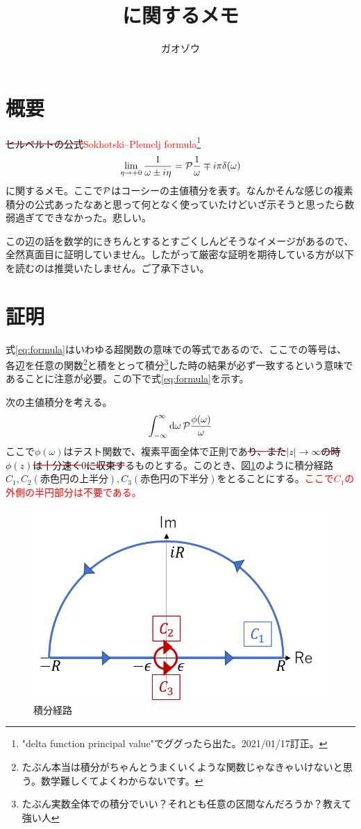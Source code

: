 \documentclass[uplatex,dvipdfmx]{jsarticle}
\title{\Erase{ヒルベルトの公式}\Add{Sokhotski–Plemelj formula}に関するメモ}
\author{ガオゾウ}
\newcommand{\Erase}[1]{\textcolor{red}{\sout{\textcolor{black}{#1}}}}
\newcommand{\Add}[1]{\textcolor{red}{#1}}
\begin{document}
\maketitle
\section{概要}
\Erase{ヒルベルトの公式}\Add{Sokhotski–Plemelj formula}\footnote{"delta function principal value"でググったら出た。2021/01/17訂正。}
\begin{equation}
	\lim_{\eta \to +0}\frac{1}{\omega \pm i\eta} = \pv{\frac{1}{\omega}} \mp i\pi \delta(\omega) \label{eq:formula}
\end{equation}
に関するメモ。ここで$\pv$はコーシーの主値積分を表す。なんかそんな感じの複素積分の公式あったなあと思って何となく使っていたけどいざ示そうと思ったら数弱過ぎてできなかった。悲しい。

この辺の話を数学的にきちんとするとすごくしんどそうなイメージがあるので、全然真面目に証明していません。したがって厳密な証明を期待している方が以下を読むのは推奨いたしません。ご了承下さい。

\section{証明}
式\eqref{eq:formula}はいわゆる超関数の意味での等式であるので、ここでの等号は、各辺を任意の関数\footnote{たぶん本当は積分がちゃんとうまくいくような関数じゃなきゃいけないと思う。数学難しくてよくわからないです。}と積をとって積分\footnote{たぶん実数全体での積分でいい？それとも任意の区間なんだろうか？教えて強い人}した時の結果が必ず一致するという意味であることに注意が必要。この下で式\eqref{eq:formula}を示す。

次の主値積分を考える。
\begin{equation}
	\int_{-\infty}^{\infty} \dd{\omega} \pv{ \frac{\phi(\omega)}{\omega}}
\end{equation}
ここで$\phi(\omega)$はテスト関数で、複素平面全体で正則であ\Erase{り、また$|z|\to \infty$の時$\phi(z)$は十分速く$0$に収束す}るものとする。このとき、図\ref{fig:contour}のように積分経路$C_1, C_2(赤色円の上半分), C_3(赤色円の下半分)$をとることにする。\Add{ここで$C_1$の外側の半円部分は不要である。}
\begin{figure}
	\centering
	\includegraphics{contour.png}
	\caption{積分経路}
	\label{fig:contour}
\end{figure}
\end{document}
